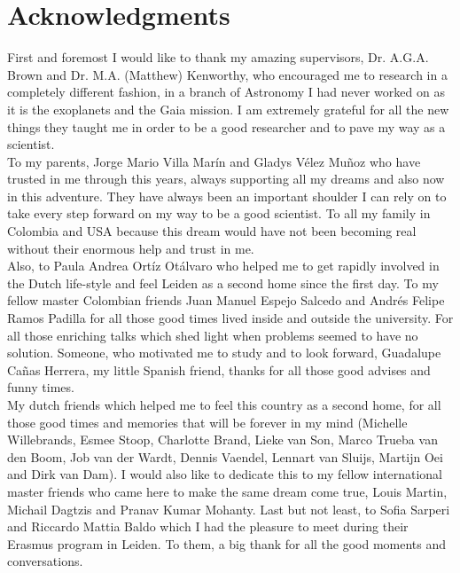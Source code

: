 \bigskip

\begingroup
\let\clearpage\relax
\let\cleardoublepage\relax
\let\cleardoublepage\relax
\chapter*{Acknowledgments}

First and foremost I would like to thank my amazing supervisors, Dr. A.G.A. Brown and Dr. M.A. (Matthew) Kenworthy, who encouraged me to research in a completely different fashion, in a branch of Astronomy I had never worked on as it is the exoplanets and the Gaia mission. I am extremely grateful for all the new things they taught me in order to be a good researcher and to pave my way as a scientist.\\

To my parents, Jorge Mario Villa Mar\'in and Gladys V\'elez Mu\~noz who have trusted in me through this years, always supporting all my dreams and also now in this adventure. They have always been an important shoulder I can rely on to take every step forward on my way to be a good scientist. To all my family in Colombia and USA because this dream would have not been becoming real without their enormous help and trust in me.\\

Also, to Paula Andrea Ort\'iz Ot\'alvaro who helped me to get rapidly involved in the Dutch life-style and feel Leiden as a second home since the first day. To my fellow master Colombian friends Juan Manuel Espejo Salcedo and Andr\'es Felipe Ramos Padilla for all those good times lived inside and outside the university. For all those enriching talks which shed light when problems seemed to have no solution. Someone, who motivated me to study and to look forward, Guadalupe Ca\~nas Herrera, my little Spanish friend, thanks for all those good advises and funny times.\\

My dutch friends which helped me to feel this country as a second home, for all those good times and memories that will be forever in my mind (Michelle Willebrands, Esmee Stoop, Charlotte Brand, Lieke van Son, Marco Trueba van den Boom, Job van der Wardt, Dennis Vaendel, Lennart van Sluijs, Martijn Oei and Dirk van Dam). I would also like to dedicate this to my fellow international master friends who came here to make the same dream come true, Louis Martin, Michail Dagtzis and Pranav Kumar Mohanty. Last but not least, to Sofia Sarperi and Riccardo Mattia Baldo which I had the pleasure to meet during their Erasmus program in Leiden. To them, a big thank for all the good moments and conversations. \\


